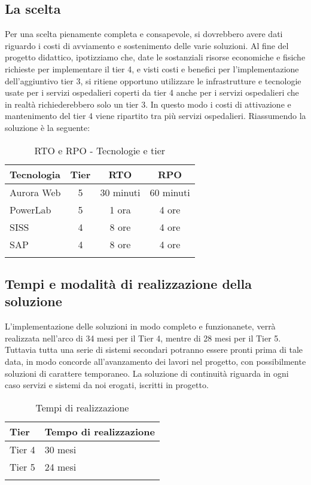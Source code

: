 \subsection{La scelta}
Per una scelta pienamente completa e consapevole, si dovrebbero avere dati riguardo i costi di avviamento e sostenimento delle varie soluzioni. Al fine del progetto didattico, ipotizziamo che, date le sostanziali risorse economiche e fisiche richieste per implementare il tier 4, e visti costi e benefici per l'implementazione dell'aggiuntivo tier 3, si ritiene opportuno utilizzare le infrastrutture e tecnologie usate per i servizi ospedalieri coperti da tier 4 anche per i servizi ospedalieri che in realtà richiederebbero solo un tier 3. In questo modo i costi di attivazione e mantenimento del tier 4 viene ripartito tra più servizi ospedalieri.
Riassumendo la soluzione è la seguente:
\renewcommand\arraystretch{1,5}
\begin{longtable}{p{4cm} c c c }
\toprule
\textbf{Tecnologia} & \textbf{Tier} & \textbf{RTO} & \textbf{RPO} \\
\toprule
	Aurora Web 	& 5 & 30 minuti & 60 minuti \\
    PowerLab 	& 5 & 1 ora 	& 4 ore \\
    SISS 		& 4 & 8 ore 	& 4 ore \\
	SAP 		& 4 & 8 ore 	& 4 ore\\
\bottomrule
\caption{RTO e RPO - Tecnologie e tier}
\end{longtable}

\subsection{Tempi e modalità di realizzazione della soluzione}
\label{ScadenzaContinuità}
L'implementazione delle soluzioni in modo completo e funzionanete, verrà realizzata nell'arco di 34 mesi per il Tier 4, mentre di 28 mesi per il Tier 5. Tuttavia tutta una serie di sistemi secondari potranno essere pronti prima di tale data, in modo concorde all'avanzamento dei lavori nel progetto, con possibilmente soluzioni di carattere temporaneo. La soluzione di continuità riguarda in ogni caso servizi e sistemi da noi erogati, iscritti in progetto.
\renewcommand\arraystretch{1,3}
\begin{longtable}{p{3cm} p{6cm}}
\toprule
\textbf{Tier} & \textbf{Tempo di realizzazione} \\
\toprule
    Tier 4 & 30 mesi \\
    Tier 5 & 24 mesi \\
\bottomrule
\caption{Tempi di realizzazione}
\end{longtable}

